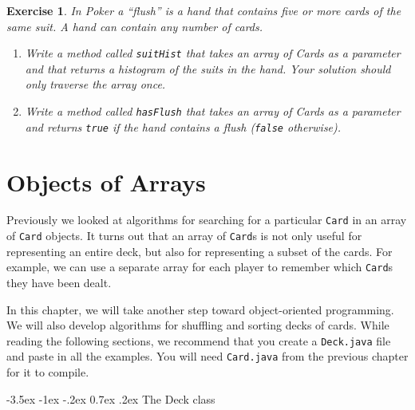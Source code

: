 \documentclass[12pt]{book}
\makeatletter
\theoremstyle{exercise}
\newtheorem{exercise}{Exercise}[chapter]
\newcommand{\java}[1]{\verb"#1"}
\renewcommand{\section}{\@startsection{section}{1}{\z@}%
    {-3.5ex \@plus -1ex \@minus -.2ex}%
    {0.7ex \@plus.2ex}%
    {\normalfont\Large\bfseries}}
\newcommand{\java}[1]{\lstinline{#1}} %
\makeatother
\begin{document}
\begin{exercise}
In Poker a ``flush'' is a hand that contains five or more cards of the same suit.
A hand can contain any number of cards.

\begin{enumerate}

\item Write a method called \java{suitHist} that takes an array of Cards as a parameter and that returns a histogram of the suits in the hand.
Your solution should only traverse the array once.

\item Write a method called \java{hasFlush} that takes an array of Cards as a parameter and returns \java{true} if the hand contains a flush (\java{false} otherwise).

\end{enumerate}

\end{exercise}


\chapter{Objects of Arrays}


Previously we looked at algorithms for searching for a particular \java{Card} in an array of \java{Card} objects.
It turns out that an array of \java{Card}s is not only useful for representing an entire deck, but also for representing a subset of the cards.
For example, we can use a separate array for each player to remember which \java{Card}s they have been dealt.

In this chapter, we will take another step toward object-oriented programming.
We will also develop algorithms for shuffling and sorting decks of cards.
While reading the following sections, we recommend that you create a {\tt Deck.java} file and paste in all the examples.
You will need {\tt Card.java} from the previous chapter for it to compile.




\section{The Deck class}
\label{deck}
\end{document}
